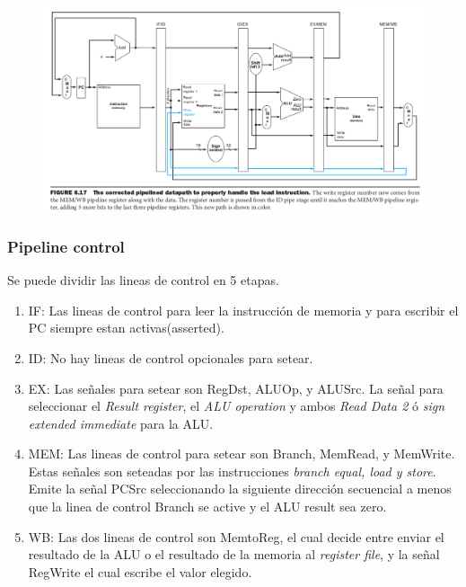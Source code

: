 \documentclass{article}
\begin{document}
\begin{figure}[h!]
    \includegraphics[width=\linewidth]{imagenes/pipeline/pipeline-loadstore.png}
\end{figure}


\newpage
\subsubsection{Pipeline control}

Se puede dividir las lineas de control en 5 etapas.
\begin{enumerate}
    \item IF: Las lineas de control para leer la instrucción de memoria y para escribir el PC siempre estan activas(asserted).
    \item ID: No hay lineas de control opcionales para setear.
    \item EX: Las señales para setear son RegDst, ALUOp, y ALUSrc. La señal para seleccionar el \textit{Result register}, el \textit{ALU operation} y ambos \textit{Read Data 2} ó \textit{sign extended immediate} para la ALU.
    \item MEM: Las lineas de control para setear son Branch, MemRead, y MemWrite. Estas señales son seteadas por las instrucciones \textit{branch equal, load y store}. Emite la señal PCSrc seleccionando la siguiente dirección secuencial a menos que la linea de control Branch se active y el ALU result sea zero. 
    \item WB: Las dos lineas de control son MemtoReg, el cual decide entre enviar el resultado de la ALU o el resultado de la memoria al \textit{register file}, y la señal RegWrite el cual escribe el valor elegido. 
\end{enumerate}
\end{document}
